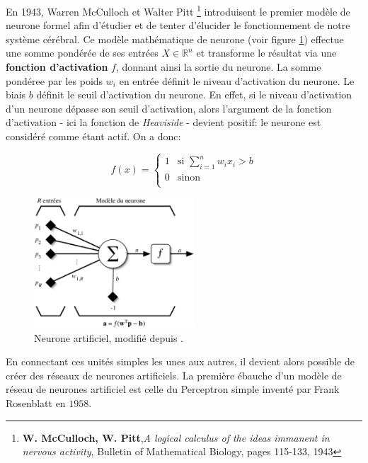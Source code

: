 En 1943, Warren McCulloch et Walter Pitt \cite{macculloch}\footnote{\textbf{W.
McCulloch, W. Pitt},\textit{A logical calculus of the ideas immanent in nervous
activity}, Bulletin of Mathematical Biology, pages 115-133, 1943} introduisent
le premier modèle de neurone formel afin d'étudier et de tenter d'élucider le
fonctionnement de notre système cérébral. Ce modèle mathématique de neurone
(voir figure \ref{fig:neuroformel}) effectue une somme pondérée de ses entrées
$X\in\mathbb{R}^{n}$ et transforme le résultat via une \textbf{fonction
d'activation} $f$, donnant ainsi la sortie du neurone. La somme pondéree par
les poids $w_{i}$ en entrée définit le niveau d'activation du neurone. Le biais
$b$ définit le seuil d'activation du neurone. En effet, si le niveau
d'activation d'un neurone dépasse son seuil d'activation, alors l'argument de
la fonction d'activation - ici la fonction de \textit{Heaviside} - devient
positif: le neurone est considéré comme étant actif. On a donc:

\begin{equation}
f(x)=\left\{\begin{array}{ll}
1 & \textrm{si }  \sum_{i=1}^{n}w_{i}x_{i}>b\\
0 & \textrm{sinon} \\
\end{array}\right.
\end{equation}

\begin{figure}
\begin{center}
\includegraphics[width=6cm]{predoc/images/neurone_artificiel.eps}
\end{center}
\caption{\label{fig:neuroformel} Neurone artificiel, modifié depuis \cite{parizeau}.}
\end{figure}


En connectant ces unités simples les unes aux autres, il devient alors possible
de créer des réseaux de neurones artificiels. La première ébauche d'un modèle
de réseau de neurones artificiel est celle du Perceptron simple inventé par
Frank Rosenblatt en $1958$.

